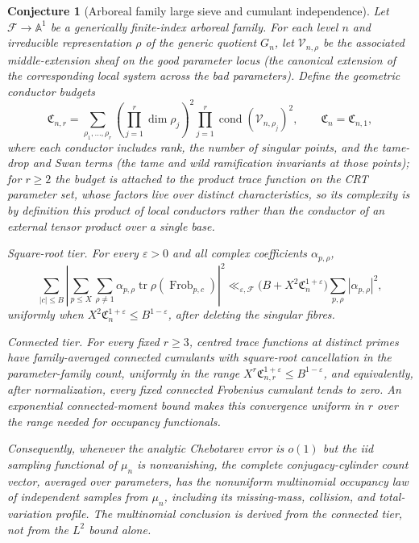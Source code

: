 \documentclass[11pt]{article}
\newtheorem{conjecture}{Conjecture}
\theoremstyle{definition}
\newcommand{\eps}{\varepsilon}
\begin{document}
\begin{conjecture}[Arboreal family large sieve and cumulant independence]\label{s17}
Let $\mathcal F\to\mathbb A^1$ be a generically finite-index arboreal family.  For each
level $n$ and irreducible representation $\rho$ of the generic quotient $G_n$, let $\mathcal V_{n,\rho}$ be the associated middle-extension sheaf on the good parameter locus (the canonical extension of the corresponding local system across the bad parameters).  Define the geometric conductor budgets
\[
 \mathfrak C_{n,r}=
 \sum_{\rho_1,\ldots,\rho_r}
 \left(\prod_{j=1}^r\dim\rho_j\right)^2
 \prod_{j=1}^r\operatorname{cond}\!\left(\mathcal V_{n,\rho_j}\right)^2,
 \qquad \mathfrak C_n=\mathfrak C_{n,1},
\]
where each conductor includes rank, the number of singular points, and the tame-drop and Swan terms (the tame and wild ramification invariants at those points); for $r\ge2$ the budget is attached to the product trace function on the CRT parameter set, whose factors live over distinct characteristics, so its complexity is by definition this product of local conductors rather than the conductor of an external tensor product over a single base.

\emph{Square-root tier.}  For every $\eps>0$ and all complex coefficients
$\alpha_{p,\rho}$,
\[
 \sum_{|c|\le B}
 \left|\sum_{p\le X}\sum_{\rho\ne1}
  \alpha_{p,\rho}\operatorname{tr}
  \rho(\operatorname{Frob}_{p,c})\right|^2
 \ll_{\eps,\mathcal F}
 \bigl(B+X^2\mathfrak C_n^{1+\eps}\bigr)
 \sum_{p,\rho}|\alpha_{p,\rho}|^2,
\]
uniformly when $X^2\mathfrak C_n^{1+\eps}\le B^{1-\eps}$, after deleting the
singular fibres.

\emph{Connected tier.}  For every fixed $r\ge3$, centred trace functions at distinct
primes have family-averaged connected cumulants with square-root cancellation in the parameter-family count, uniformly in the
range $X^r\mathfrak C_{n,r}^{1+\eps}\le B^{1-\eps}$, and equivalently, after normalization,
every fixed connected Frobenius cumulant tends to zero.  An exponential connected-moment
bound makes this convergence uniform in $r$ over the range needed for occupancy
functionals.

Consequently, whenever the analytic Chebotarev error is $o(1)$ but the iid sampling
functional of $\mu_n$ is nonvanishing, the complete conjugacy-cylinder count vector,
averaged over parameters, has the nonuniform multinomial occupancy law of independent
samples from $\mu_n$, including its missing-mass, collision, and total-variation profile.
The multinomial conclusion is derived from the connected tier, not from the $L^2$ bound
alone.
\end{conjecture}
\end{document}
